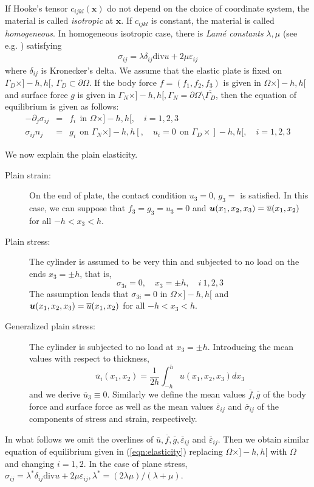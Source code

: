 \documentclass[a4paper,twoside,12pt]{book}
\def\key#1{\emph{#1}\index{#1}}
\def\vec#1{\mbox{\boldmath $#1$}}
\def\p{\partial}
\begin{document}
If Hooke's tensor $c_{ijkl}(\mathbf{x})$ do not depend on the choice of
coordinate system, the material is called \key{isotropic} at $\mathbf{x}$.
If $c_{ijkl}$ is constant, the material is called \emph{homogeneous}.
In homogeneous isotropic case, there is \emph{Lam\'{e} constants}
$\lambda, \mu$ (see e.g. \cite[p.43]{Necas}) satisfying
\begin{eqnarray}
\label{eqn:isotropic}
\sigma_{ij}=\lambda\delta_{ij}\textrm{div}u+2\mu \varepsilon_{ij}
\end{eqnarray}
where $\delta_{ij}$ is Kronecker's delta.
We assume that
the elastic plate is fixed
on $\Gamma_D\times ]-h,h[,\, \Gamma_D\subset \p\Omega$.
If the body force $f=(f_1,f_2,f_3)$ is given in $\Omega\times]-h,h[$
and surface force $g$ is given in $\Gamma_N\times]-h,h[,
\Gamma_N=\p\Omega\setminus\overline{\Gamma_D}$,
then the equation of equilibrium is given as follows:
\begin{eqnarray}
\label{eqn:elasticity}
-\p_j \sigma_{ij}&=&f_i~~\textrm{in }\Omega\times ]-h,h[,\quad
i=1,2,3\\
\sigma_{ij}n_j&=&g_i~~\textrm{on }\Gamma_N\times ]-h,h[,\quad
u_i=0~~\textrm{on }\Gamma_D\times ]-h,h[,\quad i=1,2,3
\end{eqnarray}

We now explain the plain elasticity.
\begin{description}
\item[Plain strain:]
On the end of plate, the contact condition $u_3=0,\, g_3=$ is satisfied.
In this case, we can suppose that $f_3=g_3=u_3=0$ and
$\vec u(x_1,x_2,x_3)=\overline{u}(x_1,x_2)$ for all $-h<x_3<h$.
\item[Plain stress:]
The cylinder is assumed to be very thin and subjected to no load on the
ends $x_3=\pm h$, that is,
\[
\sigma_{3i}=0,\quad x_3=\pm h,\quad i~1,2,3
\]
The assumption leads that $\sigma_{3i}=0$ in $\Omega\times ]-h,h[$
and $\vec u(x_1,x_2,x_3)=\overline{u}(x_1,x_2)$ for all $-h<x_3<h$.
\item[Generalized plain stress:]
The cylinder is subjected to no load at $x_3=\pm h$.
Introducing the mean values with respect to thickness,
\[
\overline{u}_i(x_1,x_2)=\frac{1}{2h}
\int_{-h}^h u(x_1,x_2,x_3)dx_3
\]
and we derive $\overline{u}_3\equiv 0$. Similarly we define the mean
values $\overline{f},\overline{g}$ of the body force and surface force
as well as the mean values $\overline{\varepsilon}_{ij}$ and
$\overline{\sigma}_{ij}$ of the components of stress and strain, respectively.
\end{description}
In what follows we omit the overlines of
$\overline{u}, \overline{f},\overline{g}, \overline{\varepsilon}_{ij}$ and
$\overline{\varepsilon}_{ij}$.
Then we obtain similar equation of equilibrium given in (\ref{eqn:elasticity})
replacing $\Omega\times ]-h,h[$ with $\Omega$ and changing $i=1,2$.
In the case of plane stress,
$\sigma_{ij}=\lambda^* \delta_{ij}\textrm{div}u+2\mu\varepsilon_{ij},
\lambda^*=(2\lambda \mu)/(\lambda+\mu)$.
\end{document}
